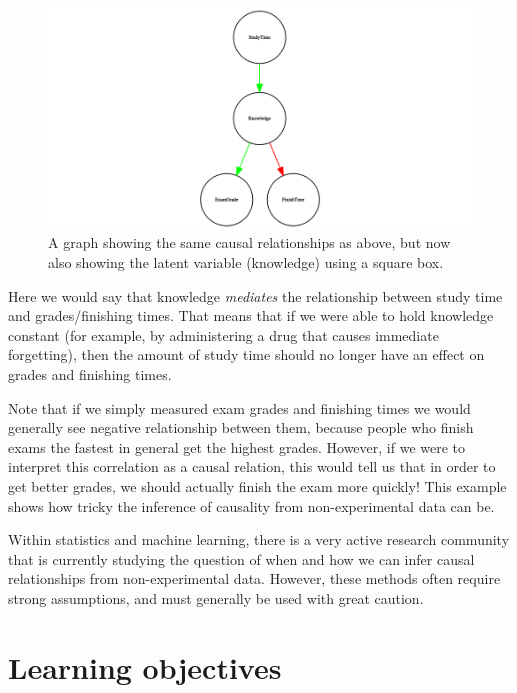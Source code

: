 \documentclass[12pt,]{book}
\theoremstyle{definition}
\theoremstyle{definition}
\theoremstyle{definition}
\theoremstyle{remark}
\begin{document}
\begin{figure}
\includegraphics[width=13.33in,height=0.5\textheight]{images/dag_latent_example} \caption{A graph showing the same causal relationships as above, but now also showing the latent variable (knowledge) using a square box.}\label{fig:latentCausalGraph}
\end{figure}

Here we would say that knowledge \emph{mediates} the relationship between study time and grades/finishing times. That means that if we were able to hold knowledge constant (for example, by administering a drug that causes immediate forgetting), then the amount of study time should no longer have an effect on grades and finishing times.

Note that if we simply measured exam grades and finishing times we would generally see negative relationship between them, because people who finish exams the fastest in general get the highest grades. However, if we were to interpret this correlation as a causal relation, this would tell us that in order to get better grades, we should actually finish the exam more quickly! This example shows how tricky the inference of causality from non-experimental data can be.

Within statistics and machine learning, there is a very active research community that is currently studying the question of when and how we can infer causal relationships from non-experimental data. However, these methods often require strong assumptions, and must generally be used with great caution.

\hypertarget{learning-objectives-12}{%
\section{Learning objectives}\label{learning-objectives-12}}
\end{document}
